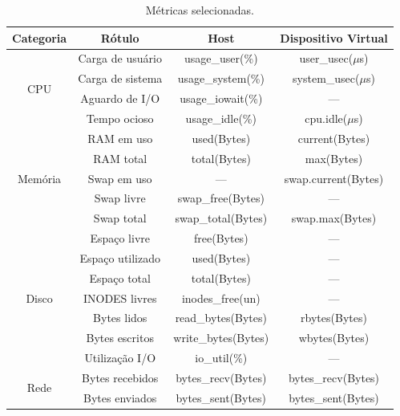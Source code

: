 \begin{table}[H]
\centering
\caption{Métricas selecionadas.}
\label{tab:metricas-selecionadas}
\begin{adjustbox}{max width=\textwidth}
\begin{tabular}{|c|c|c|c|}
\hline
\textbf{Categoria} & \textbf{Rótulo} & \textbf{Host} & \textbf{Dispositivo Virtual} \\ \hline
\multirow{4}{*}{CPU} & Carga de usuário & usage\_user(\%) & user\_usec($\mu$s) \\ \cline{2-4}
                     & Carga de sistema & usage\_system(\%) & system\_usec($\mu$s) \\ \cline{2-4}
                     & Aguardo de I/O & usage\_iowait(\%) & --- \\ \cline{2-4}
                     & Tempo ocioso & usage\_idle(\%) & cpu.idle($\mu$s) \\ \hline
\multirow{5}{*}{Memória} & RAM em uso & used(Bytes) & current(Bytes) \\ \cline{2-4}
                         & RAM total & total(Bytes) & max(Bytes) \\ \cline{2-4}
                         & Swap em uso & --- & swap.current(Bytes) \\ \cline{2-4}
                         & Swap livre & swap\_free(Bytes) & ---  \\ \cline{2-4}
                         & Swap total & swap\_total(Bytes) & swap.max(Bytes) \\ \hline
\multirow{7}{*}{Disco} & Espaço livre & free(Bytes)         & ---     \\ \cline{2-4}
                       & Espaço utilizado & used(Bytes)         & ---     \\ \cline{2-4}
                       & Espaço total & total(Bytes)        & ---     \\ \cline{2-4}
                       & INODES livres & inodes\_free(un) & ---     \\ \cline{2-4}
                       & Bytes lidos & read\_bytes(Bytes)  & rbytes(Bytes) \\ \cline{2-4}
                       & Bytes escritos & write\_bytes(Bytes) & wbytes(Bytes) \\ \cline{2-4}
                       & Utilização I/O & io\_util(\%)     & ---     \\ \hline
\multirow{8}{*}{Rede} & Bytes recebidos & bytes\_recv(Bytes)     & bytes\_recv(Bytes) \\ \cline{2-4}
                      & Bytes enviados & bytes\_sent(Bytes)     & bytes\_sent(Bytes) \\ \cline{2-4}

\end{tabular}
\end{adjustbox}
\end{table}
